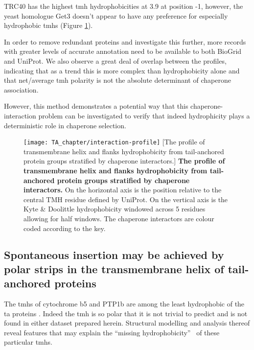 TRC40 has the highest \gls{tmh} hydrophobicities at 3.9 at position -1, however, the yeast homologue Get3 doesn't appear to have any preference for especially hydrophobic \gls{tmh}s (Figure \ref{fig:interaction-profile}).

In order to remove redundant proteins and investigate this further, more records with greater levels of accurate annotation need to be available to both BioGrid and UniProt.
We also observe a great deal of overlap between the profiles, indicating that as a trend this is more complex than hydrophobicity alone and that net/average \gls{tmh} polarity is not the absolute determinant of chaperone association.

However, this method demonstrates a potential way that this chaperone\--interaction problem can be investigated to verify that indeed hydrophicity plays a deterministic role in chaperone selection.

\begin{figure}
\centering
\texttt{[image: TA\_chapter/interaction-profile]}
[The profile of transmembrane helix and flanks hydrophobicity from tail\--anchored protein groups stratified by chaperone interactors.]
{\textbf{The profile of transmembrane helix and flanks hydrophobicity from tail\--anchored protein groups stratified by chaperone interactors.}
On the horizontal axis is the position relative to the central TMH residue defined by UniProt.
On the vertical axis is the Kyte \& Doolittle hydrophobicity windowed across 5 residues allowing for half windows.
The chaperone interactors are colour coded according to the key.
}

\label{fig:interaction-profile}
\end{figure}

\subsection{Spontaneous insertion may be achieved by polar strips in the transmembrane helix of tail-anchored proteins}

The \gls{tmh}s of cytochrome b5 and PTP1b are among the least hydrophobic of the \gls{ta} proteins \cite{Rabu2008, Rabu2009}.
Indeed the \gls{tmh} is so polar that it is not trivial to predict and is not found in either dataset prepared herein.
Structural modelling and analysis thereof reveal features that may explain the ``missing hydrophobicity''~\cite{Hessa2005, Hedin2010, Hessa2007, Ojemalm2012} of these particular \gls{tmh}s.

